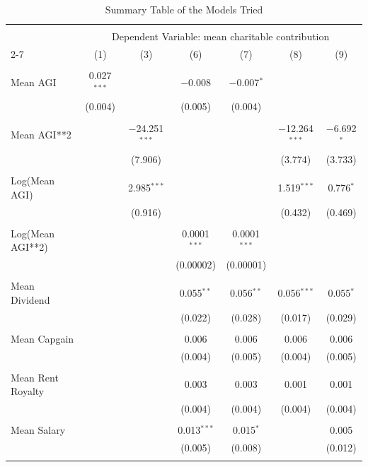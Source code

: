 \documentclass[
  letterpaper,
  DIV=11,
  numbers=noendperiod]{scrartcl}
\begin{document}
\begin{table}[!htbp] \centering 
  \caption{Summary Table of the Models Tried} 
  \label{} 
\tiny 
\begin{tabular}{@{\extracolsep{.001pt}}lcccccc} 
\\[-1.8ex]\hline 
\hline \\[-1.8ex] 
 & \multicolumn{6}{c}{Dependent Variable: mean charitable contribution} \\ 
\cline{2-7} 
 & (1) & (3) & (6) & (7) & (8) & (9) \\ 
\hline \\[-1.8ex] 
 Mean AGI & 0.027$^{***}$ &  & $-$0.008 & $-$0.007$^{*}$ &  &  \\ 
  & (0.004) &  & (0.005) & (0.004) &  &  \\ 
  & & & & & & \\ 
 Mean AGI**2 &  & $-$24.251$^{***}$ &  &  & $-$12.264$^{***}$ & $-$6.692$^{*}$ \\ 
  &  & (7.906) &  &  & (3.774) & (3.733) \\ 
  & & & & & & \\ 
 Log(Mean AGI) &  & 2.985$^{***}$ &  &  & 1.519$^{***}$ & 0.776$^{*}$ \\ 
  &  & (0.916) &  &  & (0.432) & (0.469) \\ 
  & & & & & & \\ 
 Log(Mean AGI**2) &  &  & 0.0001$^{***}$ & 0.0001$^{***}$ &  &  \\ 
  &  &  & (0.00002) & (0.00001) &  &  \\ 
  & & & & & & \\ 
 Mean Dividend &  &  & 0.055$^{**}$ & 0.056$^{**}$ & 0.056$^{***}$ & 0.055$^{*}$ \\ 
  &  &  & (0.022) & (0.028) & (0.017) & (0.029) \\ 
  & & & & & & \\ 
 Mean Capgain &  &  & 0.006 & 0.006 & 0.006 & 0.006 \\ 
  &  &  & (0.004) & (0.005) & (0.004) & (0.005) \\ 
  & & & & & & \\ 
 Mean Rent Royalty &  &  & 0.003 & 0.003 & 0.001 & 0.001 \\ 
  &  &  & (0.004) & (0.004) & (0.004) & (0.004) \\ 
  & & & & & & \\ 
 Mean Salary &  &  & 0.013$^{***}$ & 0.015$^{*}$ &  & 0.005 \\ 
  &  &  & (0.005) & (0.008) &  & (0.012) \\ 
  & & & & & & \\ 

\end{tabular}
\end{table}
\end{document}
